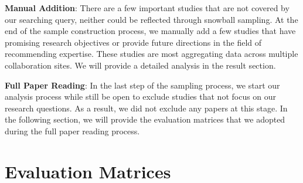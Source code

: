 \textbf{Manual Addition}: There are a few important studies that are not covered by our searching query, neither could be reflected through snowball sampling. At the end of the sample construction process, we manually add a few studies that have promising research objectives or provide future directions in the field of recommending expertise. These studies are most aggregating data across multiple collaboration sites. We will provide a detailed analysis in the result section.

\textbf{Full Paper Reading}: In the last step of the sampling process, we start our analysis process while still be open to exclude studies that not focus on our research questions. As a result, we did not exclude any papers at this stage. In the following section, we will provide the evaluation matrices that we adopted during the full paper reading process. 

\section{Evaluation Matrices}


